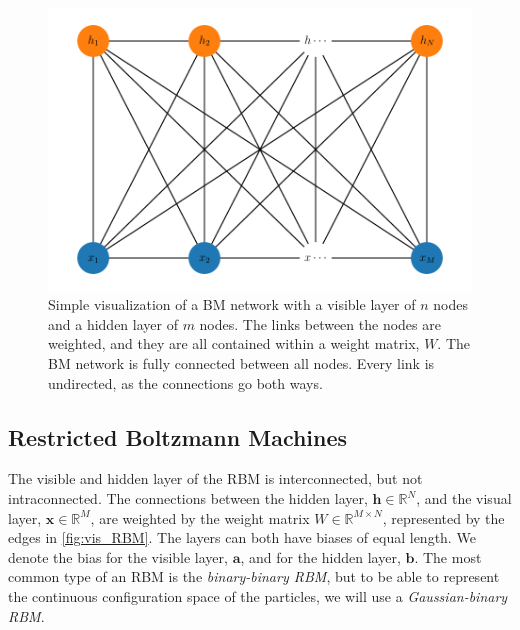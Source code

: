 \begin{figure}[H]
\begin{center}\includegraphics[scale=0.8]{latex/latex-report/Images/bm_visualize.pdf}
\end{center}
\caption{Simple visualization of a BM network with a visible layer of $n$ nodes and a hidden layer of $m$ nodes. The links between the nodes are weighted, and they are all contained within a weight matrix, $W$. The BM network is fully connected between all nodes. Every link is undirected, as the connections go both ways.}
\label{fig:vis_BM}
\end{figure}

\subsection{Restricted Boltzmann Machines}
The visible and hidden layer of the RBM is interconnected, but not intraconnected. The connections between the hidden layer, $\bm{h}\in\mathbb{R}^N$, and the visual layer, $\bm{x}\in\mathbb{R}^M$, are weighted by the weight matrix $W\in\mathbb{R}^{M\times N}$, represented by the edges in \autoref{fig:vis_RBM}. The layers can both have biases of equal length. We denote the bias for the visible layer, $\bm{a}$, and for the hidden layer, $\bm{b}$. 
The most common type of an RBM is the \textit{binary-binary RBM}, but to be able to represent the continuous configuration space of the particles, we will use a \textit{Gaussian-binary RBM}. 


